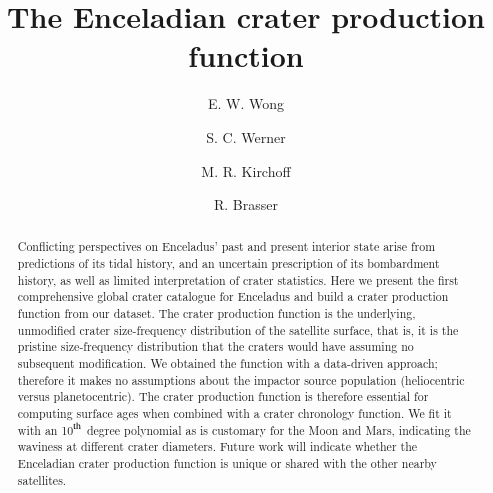 \documentclass[preprint,11pt,3p,times,authoryear]{elsarticle}
\begin{document}
\begin{frontmatter}

\title{The Enceladian crater production function}

\author[UniGe,ELSI]{E. W. Wong}
\author[UiO]{S. C. Werner}
\author[SW]{M. R. Kirchoff}
\author[CSFK,UiO]{R. Brasser}







%
\linenumbers
\begin{abstract}
Conflicting perspectives on Enceladus' past and present interior state arise from predictions of its tidal history, and an uncertain prescription of its bombardment history, as well as limited interpretation of crater statistics. Here we present the first comprehensive global crater catalogue for Enceladus and build a crater production function from our dataset. The crater production function is the underlying, unmodified crater size-frequency distribution of the satellite surface, that is, it is the pristine size-frequency distribution that the craters would have assuming no subsequent modification. We obtained the function with a data-driven approach;  therefore it makes no assumptions about the impactor source population (heliocentric versus planetocentric). The crater production function is therefore essential for computing surface ages when combined with a crater chronology function. We fit it with an 10$^{\rm th}$ degree polynomial as is customary for the Moon and Mars, indicating the waviness at different crater diameters. Future work will indicate whether the Enceladian crater production function is unique or shared with the other nearby satellites.
\end{abstract}


\end{frontmatter}
\end{document}
